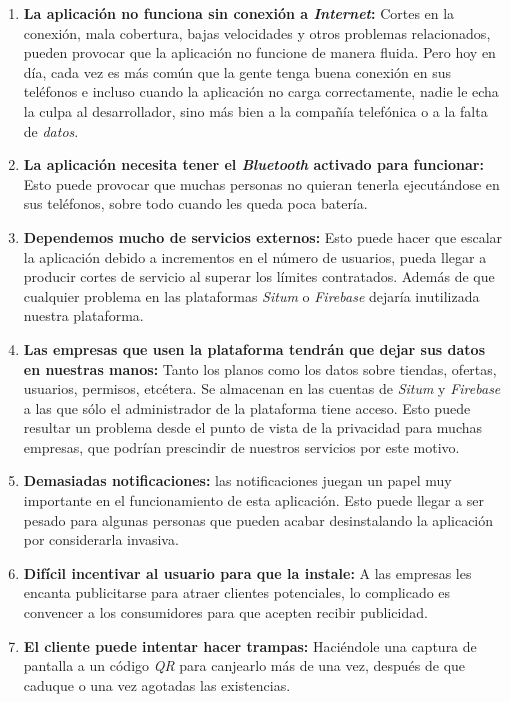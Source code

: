 \begin{enumerate}
\item \textbf{La aplicación no funciona sin conexión a \textit{Internet}:} Cortes en la conexión, mala cobertura, bajas velocidades y otros problemas relacionados, pueden provocar que la aplicación no funcione de manera fluida. Pero hoy en día, cada vez es más común que la gente tenga buena conexión en sus teléfonos e incluso cuando la aplicación no carga correctamente, nadie le echa la culpa al desarrollador, sino más bien a la compañía telefónica o a la falta de \textit{datos}.
\item \textbf{La aplicación necesita tener el \textit{Bluetooth} activado para funcionar:} Esto puede provocar que muchas personas no quieran tenerla ejecutándose en sus teléfonos, sobre todo cuando les queda poca batería.
\item \textbf{Dependemos mucho de servicios externos:} Esto puede hacer que escalar la aplicación debido a incrementos en el número de usuarios, pueda llegar a producir cortes de servicio al superar los límites contratados. Además de que cualquier problema en las plataformas \textit{Situm} o \textit{Firebase} dejaría inutilizada nuestra plataforma.
\item \textbf{Las empresas que usen la plataforma tendrán que dejar sus datos en nuestras manos:} Tanto los planos como los datos sobre tiendas, ofertas, usuarios, permisos, etcétera. Se almacenan en las cuentas de \textit{Situm} y \textit{Firebase} a las que sólo el administrador de la plataforma tiene acceso. Esto puede resultar un problema desde el punto de vista de la privacidad para muchas empresas, que podrían prescindir de nuestros servicios por este motivo.
\item \textbf{Demasiadas notificaciones:} las notificaciones juegan un papel muy importante en el funcionamiento de esta aplicación. Esto puede llegar a ser pesado para algunas personas que pueden acabar desinstalando la aplicación por considerarla invasiva.
\item \textbf{Difícil incentivar al usuario para que la instale:} A las empresas les encanta publicitarse para atraer clientes potenciales, lo complicado es convencer a los consumidores para que acepten recibir publicidad.
\item \textbf{El cliente puede intentar hacer trampas:} Haciéndole una captura de pantalla a un código \textit{QR} para canjearlo más de una vez, después de que caduque o una vez agotadas las existencias.
\end{enumerate}

